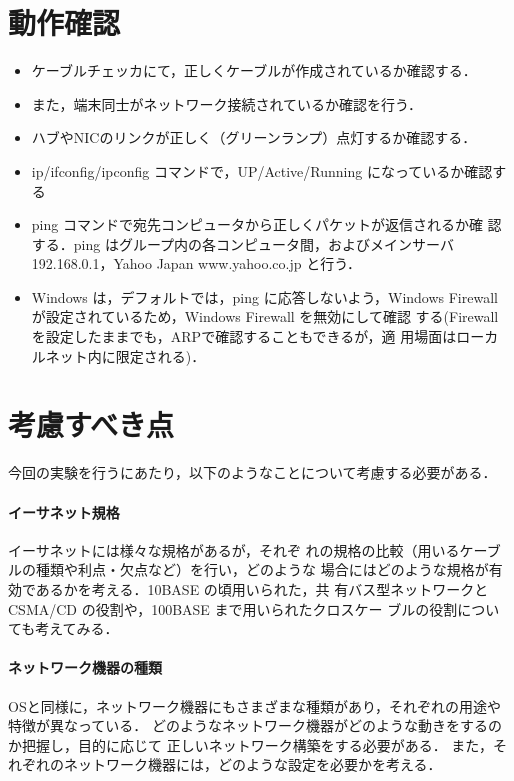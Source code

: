 \section{動作確認}
\begin{itemize}
 \item ケーブルチェッカにて，正しくケーブルが作成されているか確認する．
 \item また，端末同士がネットワーク接続されているか確認を行う．
 \item ハブやNICのリンクが正しく（グリーンランプ）点灯するか確認する．
 \item ip/ifconfig/ipconfig コマンドで，UP/Active/Running になっているか確認する
 \item ping コマンドで宛先コンピュータから正しくパケットが返信されるか確
       認する．ping はグループ内の各コンピュータ間，およびメインサーバ
       192.168.0.1，Yahoo Japan www.yahoo.co.jp と行う．
 \item Windows は，デフォルトでは，ping に応答しないよう，Windows
       Firewall が設定されているため，Windows Firewall を無効にして確認
       する(Firewall を設定したままでも，ARPで確認することもできるが，適
       用場面はローカルネット内に限定される)．
\end{itemize}

\section{考慮すべき点}
今回の実験を行うにあたり，以下のようなことについて考慮する必要がある．

\paragraph{イーサネット規格} イーサネットには様々な規格があるが，それぞ
れの規格の比較（用いるケーブルの種類や利点・欠点など）を行い，どのような
場合にはどのような規格が有効であるかを考える．10BASE の頃用いられた，共
有バス型ネットワークとCSMA/CD の役割や，100BASE まで用いられたクロスケー
ブルの役割についても考えてみる．

\paragraph{ネットワーク機器の種類}
OSと同様に，ネットワーク機器にもさまざまな種類があり，それぞれの用途や特徴が異なっている．
どのようなネットワーク機器がどのような動きをするのか把握し，目的に応じて
正しいネットワーク構築をする必要がある．
また，それぞれのネットワーク機器には，どのような設定を必要かを考える．

